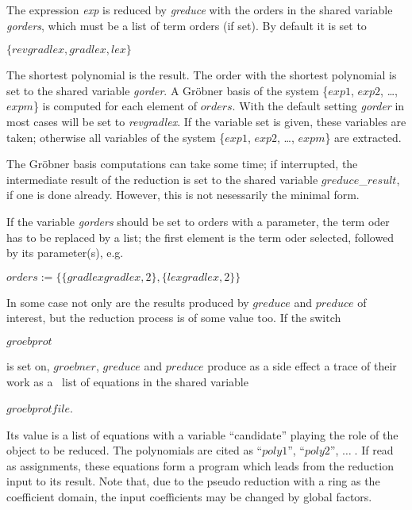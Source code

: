 The expression {\it exp} is reduced by {\it greduce} with the orders
in the shared variable {\it gorders}, which must be a list of term
orders (if set). By default it is set to

\begin{center}
$\{revgradlex,gradlex,lex\}$
\end{center}

The shortest polynomial is the result.
The order with the shortest polynomial is set to the shared variable
{\it gorder}. A Gr\"obner basis of the system \{$exp1$, $exp2$, \ldots ,
$expm$\} is computed for each element of $orders$.
With the default setting {\it gorder} in most cases will be set
to {\it revgradlex}.
If the variable set is given, these variables are taken; otherwise all
variables of the system \{$exp1$, $exp2$, \ldots , $expm$\} are
extracted.
 
The Gr\"obner basis computations can take some time; if interrupted, the
intermediate result of the reduction is set to the shared variable
$greduce$\_$result$, if one is done already. However, this is not
nesessarily the minimal form.
 
If the variable {\it gorders} should be set to orders with a parameter,
the term oder has to be replaced by a list; the first element is the
term oder selected, followed by its parameter(s), e.g.

\begin{center}
$orders:=\{\{gradlexgradlex,2\},\{lexgradlex,2\}\}$
\end{center}

In some case not only are the results produced by $greduce$ and
$preduce$ of interest, but the reduction process is of some value
too. If the switch
\begin{center}
$groebprot$
\end{center}
is set on, $groebner$, $greduce$ and $preduce$ produce as a side effect
a trace of their work as a \REDUCE \  list of equations in the shared variable
\begin{center}
$groebprotfile$.
\end{center}
Its value is a list of equations with a variable ``candidate'' playing
the role of the object to be reduced. The polynomials are cited as
``$poly1$'', ``$poly2$'', $\ldots\;$. If read as assignments, these equations
form a program which leads from the reduction input to its result.
Note that, due to the pseudo reduction with a ring as the coefficient
domain, the input coefficients may be changed by global factors.

